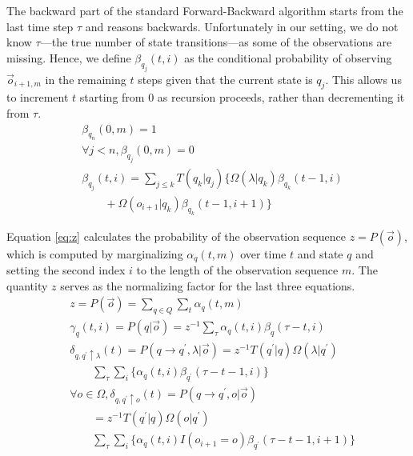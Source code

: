 \documentclass[letterpaper]{article}
\begin{document}
The backward part of the standard Forward-Backward algorithm starts from the last time step $\tau$ and reasons backwards. Unfortunately in our setting, we do not know $\tau$---the true number of state transitions---as some of the observations are missing.  Hence, we define $\beta_{q_j}(t,i)$ as the conditional probability of observing $\vec{o}_{i+1,m}$ in the remaining $t$ steps given that the current state is $q_j$.  This allows us to increment $t$ starting from $0$ as recursion proceeds, rather than decrementing it from $\tau$.
{\footnotesize
\begin{align}
&\beta_{q_n}(0,m) = 1 \\
&\forall j < n, \beta_{q_j}(0,m) = 0 \\
&\beta_{q_j}(t,i) = \sum_{j \leq k} T(q_k|q_j) \{ \Omega(\lambda|q_k) \beta_{q_k}(t-1,i) \\  %
&\qquad + \Omega(o_{i+1}|q_k) \beta_{q_k}(t-1,i+1) \} \nonumber %
\end{align}
}%

Equation \ref{eq:z} calculates the probability of the observation sequence $z = P(\vec{o})$, which is computed by marginalizing $\alpha_q(t,m)$ over time $t$ and state $q$ and setting the second index $i$ to the length of the observation sequence $m$. The quantity $z$ serves as the normalizing factor for the last three equations.
{\footnotesize
\begin{align}
&z = P(\vec{o}) = \sum_{q \in Q} \sum_{t} \alpha_{q}(t,m) \label{eq:z}\\
&\gamma_q(t,i) = P(q | \vec{o}) = z^{-1} \sum_{\tau} \alpha_q(t,i) \beta_q(\tau-t,i) \label{eq:gamma}\\
&\delta_{q,q^\prime \uparrow \lambda}(t) = P(q \rightarrow q^\prime,\lambda | \vec{o}) = z^{-1}T(q^\prime | q) \Omega(\lambda |q^\prime) \label{eq:delta1}\\
&\qquad \sum_{\tau} \sum_i \{ \alpha_q(t,i) \beta_{q^\prime}(\tau-t-1,i) \} \nonumber\\
&\forall o \in \Omega, \delta_{q,q^\prime \uparrow o}(t) = P(q \rightarrow q^\prime,o | \vec{o}) \label{eq:delta2}\\
&\qquad = z^{-1}T(q^\prime | q) \Omega(o | q^\prime) \nonumber\\
&\qquad \sum_{\tau} \sum_i \{ \alpha_q(t,i) I(o_{i+1}=o) \beta_{q^\prime}(\tau-t-1,i+1) \} \nonumber
\end{align}
}%
\end{document}
